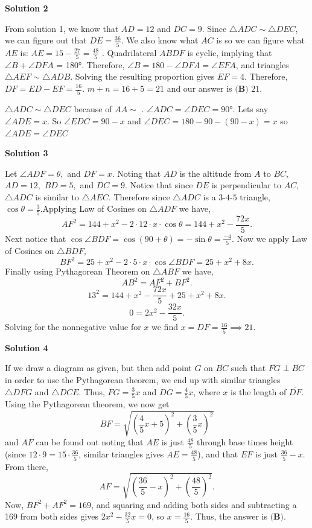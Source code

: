 \begin{enumerate}
 



\textbf{Solution 2}

From solution 1, we know that $AD = 12$ and $DC = 9$. Since $\triangle ADC \sim \triangle DEC$, we can figure out that $DE = \frac{36}{5}$. We also know what $AC$ is so we can figure what $AE$ is: $AE = 15 - \frac{27}{5} = \frac{48}{5}$ . Quadrilateral $ABDF$ is cyclic, implying that $\angle{B} + \angle{DFA}$ = 180°. Therefore, $\angle{B} = 180 - \angle{DFA} = \angle{EFA}$, and triangles $\triangle AEF \sim \triangle ADB$. Solving the resulting proportion gives $EF = 4$. Therefore, $DF = ED - EF = \frac{16}{5}$. $m + n = 16 + 5 = 21$ and our answer is $\boxed{\textbf{(B) } 21}$. 

 $\triangle ADC \sim \triangle DEC$ because of $AA \sim$ . $\angle{ADC} = \angle{DEC} = 90°$. Lets say $\angle{ADE} = x$. So  $\angle{EDC} = 90 - x$ and $\angle{DEC} = 180 - 90 - (90 - x) = x$ so $\angle{ADE} = \angle{DEC}$




\textbf{Solution 3}

Let $\angle{ADF} = \theta,$ and $DF = x.$ Noting that $AD$ is the altitude from $A$ to $BC,$ $AD=12,$ $BD = 5,$ and $DC = 9.$ Notice that since $DE$ is perpendicular to $AC$, $\triangle{ADC}$ is similar to $\triangle{AEC}.$ Therefore since $\triangle{ADC}$ is a $3$-$4$-$5$ triangle, $\cos{\theta}=\frac{3}{5}.$Applying Law of Cosines on $\triangle{ADF}$ we have,
 \[AF^2 = 144+x^2 - 2\cdot 12 \cdot x \cdot \cos{\theta} = 144+x^2 - \frac{72x}{5}.\] Next notice that $\cos{\angle{BDF}} = \cos{(90 + \theta)} = -\sin{\theta} = \frac{-4}{5}.$ Now we apply Law of Cosines on $\triangle{BDF},$
 \[BF^2 = 25 + x^2 - 2 \cdot 5 \cdot x \cdot \cos{\angle{BDF}} = 25 + x^2 + 8x.\]Finally using Pythagorean Theorem on $\triangle{ABF}$ we have, 
 \[AB^2 = AF^2 + BF^2.\] 
 \[13^2 = 144+x^2 - \frac{72x}{5} + 25 + x^2 + 8x.\] 
 \[0 = 2x^2 - \frac{32x}{5}.\] Solving for the nonnegative value for $x$ we find $x = DF = \frac{16}{5} \implies \boxed{21}.$




\textbf{Solution 4}

If we draw a diagram as given, but then add point $G$ on $\overline{BC}$ such that $\overline{FG}\perp\overline{BC}$ in order to use the Pythagorean theorem, we end up with similar triangles $\triangle{DFG}$ and $\triangle{DCE}$. Thus, $FG=\frac35x$ and $DG=\frac45x$, where $x$ is the length of $\overline{DF}$. Using the Pythagorean theorem, we now get 
 \[BF = \sqrt{\left(\frac45x+ 5\right)^2 + \left(\frac35x\right)^2}\] and $AF$ can be found out noting that $AE$ is just $\frac{48}5$ through base times height (since $12\cdot 9 = 15 \cdot \frac{36}5$, similar triangles gives $AE = \frac{48}5$), and that $EF$ is just $\frac{36}5 - x$.  From there, 
 \[AF = \sqrt{\left(\frac{36}5 - x\right)^2 + \left(\frac{48}5\right)^2}.\] Now, $BF^2 + AF^2 = 169$, and squaring and adding both sides and subtracting a 169 from both sides gives $2x^2 - \frac{32}5x = 0$, so $x = \frac{16}5$. Thus, the answer is $\boxed{\textbf{(B)}}$.


\end{enumerate}
